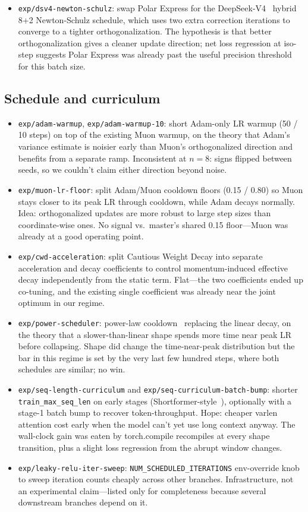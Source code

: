 \documentclass[10pt,letterpaper]{article}
\newcommand{\code}[1]{\texttt{\small #1}}
\begin{document}
\begin{itemize}[leftmargin=1.2em,itemsep=4pt]
  \item \code{exp/dsv4-newton-schulz}: swap Polar Express for the DeepSeek-V4~\cite{deepseek_v4} hybrid 8+2 Newton-Schulz schedule, which uses two extra correction iterations to converge to a tighter orthogonalization. The hypothesis is that better orthogonalization gives a cleaner update direction; net loss regression at iso-step suggests Polar Express was already past the useful precision threshold for this batch size.
\end{itemize}

\subsection{Schedule and curriculum}
\begin{itemize}[leftmargin=1.2em,itemsep=4pt]
  \item \code{exp/adam-warmup}, \code{exp/adam-warmup-10}: short Adam-only LR warmup (50 / 10 steps) on top of the existing Muon warmup, on the theory that Adam's variance estimate is noisier early than Muon's orthogonalized direction and benefits from a separate ramp. Inconsistent at $n=8$: signs flipped between seeds, so we couldn't claim either direction beyond noise.
  \item \code{exp/muon-lr-floor}: split Adam/Muon cooldown floors (0.15 / 0.80) so Muon stays closer to its peak LR through cooldown, while Adam decays normally. Idea: orthogonalized updates are more robust to large step sizes than coordinate-wise ones. No signal vs.\ master's shared 0.15 floor---Muon was already at a good operating point.
  \item \code{exp/cwd-acceleration}: split Cautious Weight Decay into separate acceleration and decay coefficients to control momentum-induced effective decay independently from the static term. Flat---the two coefficients ended up co-tuning, and the existing single coefficient was already near the joint optimum in our regime.
  \item \code{exp/power-scheduler}: power-law cooldown~\cite{power_scheduler} replacing the linear decay, on the theory that a slower-than-linear shape spends more time near peak LR before collapsing. Shape did change the time-near-peak distribution but the bar in this regime is set by the very last few hundred steps, where both schedules are similar; no win.
  \item \code{exp/seq-length-curriculum} and \code{exp/seq-curriculum-batch-bump}: shorter \code{train\_max\_seq\_len} on early stages (Shortformer-style~\cite{shortformer}), optionally with a stage-1 batch bump to recover token-throughput. Hope: cheaper varlen attention cost early when the model can't yet use long context anyway. The wall-clock gain was eaten by torch.compile recompiles at every shape transition, plus a slight loss regression from the abrupt window changes.
  \item \code{exp/leaky-relu-iter-sweep}: \code{NUM\_SCHEDULED\_ITERATIONS} env-override knob to sweep iteration counts cheaply across other branches. Infrastructure, not an experimental claim---listed only for completeness because several downstream branches depend on it.
\end{itemize}
\end{document}
